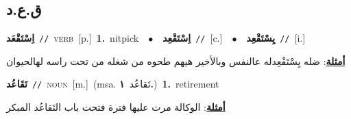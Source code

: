 \documentclass[10pt,a4paper,twoside]{article} %
\begin{document}
\begin{multicols}{2}
\vspace{-3mm}
\subsection*{\color{blue}\foreignlanguage{arabic}{ق.ع.د}\color{blue}{}} 

{\setlength\topsep{0pt}\textbf{\foreignlanguage{arabic}{اِسْتَقْعَد}}\ {\color{gray}\texttt{//}\color{black}}\ \textsc{verb}\ [p.]\ \textbf{1.}~nitpick\ \ $\bullet$\ \ \setlength\topsep{0pt}\textbf{\foreignlanguage{arabic}{اِسْتَقْعِد}}\ {\color{gray}\texttt{//}\color{black}}\ [c.]\ \ $\bullet$\ \ \setlength\topsep{0pt}\textbf{\foreignlanguage{arabic}{يِسْتَقْعِد}}\ {\color{gray}\texttt{//}\color{black}}\ [i.]\  \begin{flushright}\color{gray}\foreignlanguage{arabic}{\textbf{\underline{\foreignlanguage{arabic}{أمثلة}}}: ضله يِسْتَقْعِدله عالنفس وبالأخير هيهم طحوه من شغله من تحت راسه لهالحيوان}\end{flushright}\color{black}} \vspace{2mm}

{\setlength\topsep{0pt}\textbf{\foreignlanguage{arabic}{تَقَاعُد}}\ {\color{gray}\texttt{//}\color{black}}\ \textsc{noun}\ [m.]\ \color{gray}(msa. \foreignlanguage{arabic}{تَقاعُد}~\foreignlanguage{arabic}{\textbf{١.}})\color{black}\ \textbf{1.}~retirement\  \begin{flushright}\color{gray}\foreignlanguage{arabic}{\textbf{\underline{\foreignlanguage{arabic}{أمثلة}}}: الوكالة مرت عليها فترة فتحت باب التَقاعُد المبكر}\end{flushright}\color{black}} \vspace{2mm}


\end{multicols}
\end{document}
